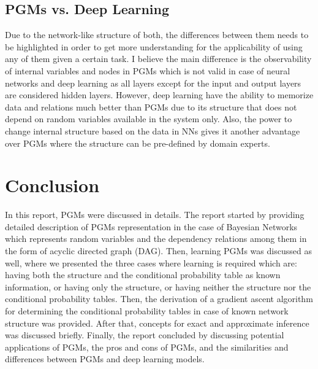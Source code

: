 \documentclass{article}
\begin{document}
\subsection{PGMs vs. Deep Learning}
Due to the network-like structure of both, the differences between them needs to be highlighted in order to get more understanding for the applicability of using any of them given a certain task. I believe the main difference is the observability of internal variables and nodes in PGMs which is not valid in case of neural networks and deep learning as all layers except for the input and output layers are considered hidden layers. However, deep learning have the ability to memorize data and relations much better than PGMs due to its structure that does not depend on random variables available in the system only. Also, the power to change internal structure based on the data in NNs gives it another advantage over PGMs where the structure can be pre-defined by domain experts. 
\section*{Conclusion}
In this report, PGMs were discussed in details. The report started by providing detailed description of PGMs representation in the case of Bayesian Networks which represents random variables and the dependency relations among them in the form of acyclic directed graph (DAG). Then, learning PGMs was discussed as well, where we presented the three cases where learning is required which are: having both the structure and the conditional probability table as known information, or having only the structure, or having neither the structure nor the conditional probability tables. Then, the derivation of a gradient ascent algorithm for determining the conditional probability tables in case of known network structure was provided. After that, concepts for exact and approximate inference was discussed briefly. Finally, the report concluded by discussing potential applications of PGMs, the pros and cons of PGMs, and the similarities and differences between PGMs and deep learning models.
\nocite{cs229}
\nocite{mitchell1997machine}
\nocite{koller2009probabilistic}
\nocite{pernkopf2014introduction}
\nocite{bishop2006pattern}
\nocite{kimArticle}
\nocite{beretta2018learning}


\end{document}
